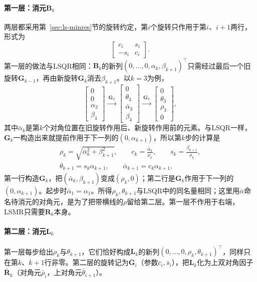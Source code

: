 \paragraph{第一层：消元$\bm B_k$}
两层都采用第~\ref{sec:ls-minres}节的旋转约定，第$i$个旋转只作用于第$i$、$i+1$两行，形式为
\[
 \begin{bmatrix}c_i&s_i\\-s_i&c_i\end{bmatrix}.
\]
第一层的做法与LSQR相同：$\bm B_k$的新列$(0,\ldots,0,\alpha_k,\beta_{k+1})^\top$只需经过最后一个旧旋转$\bm G_{k-1}$，再由新旋转$\bm G_k$消去$\beta_{k+1}$。以$k=3$为例，
\[
 \begin{bmatrix}0\\0\\\alpha_3\\\beta_4\end{bmatrix}
 \xrightarrow{\ \bm G_2\ }
 \begin{bmatrix}0\\\theta_3\\\bar\alpha_3\\\beta_4\end{bmatrix}
 \xrightarrow{\ \bm G_3\ }
 \begin{bmatrix}0\\\theta_3\\\rho_3\\0\end{bmatrix},
\]
其中$\bar\alpha_k$是第$k$个对角位置在旧旋转作用后、新旋转作用前的元素。与LSQR一样，$\bm G_k$一构造出来就提前作用于下一列的$(0,\alpha_{k+1})$，所以第$k$步的计算是
\begin{equation}
 \begin{gathered}
 \rho_k=\sqrt{\bar\alpha_k^2+\beta_{k+1}^2},\qquad
 c_k=\frac{\bar\alpha_k}{\rho_k},\qquad s_k=\frac{\beta_{k+1}}{\rho_k},\\
 \theta_{k+1}=s_k\alpha_{k+1},\qquad
 \bar\alpha_{k+1}=c_k\alpha_{k+1},
 \end{gathered}
 \label{eq:ls-lsmr-first-rotation}
\end{equation}
第一行构造$\bm G_k$，把$(\bar\alpha_k,\beta_{k+1})$变成$(\rho_k,0)$；第二行是$\bm G_k$作用于下一列的$(0,\alpha_{k+1})$。起步时$\bar\alpha_1=\alpha_1$。所得$\rho_k,\theta_{k+1}$与LSQR中的同名量相同；这里用$\bar\alpha$命名待消元的对角元，是为了把带横线的$\rho$留给第二层。第一层不作用于右端，LSMR只需要$\bm R_k$本身。

\paragraph{第二层：消元$\bm L_k$}
第一层每步给出$\rho_k$与$\theta_{k+1}$，它们恰好构成$\bm L_k$的新列$(0,\ldots,0,\rho_k,\theta_{k+1})^\top$，同样只在第$k$、$k+1$行非零。第二层的旋转记为$\bar{\bm G}_i$（参数$\bar c_i,\bar s_i$），把$\bm L_k$化为上双对角因子$\bar{\bm R}_k$（对角元$\bar\rho_i$，上对角元$\bar\theta_{i+1}$）。


